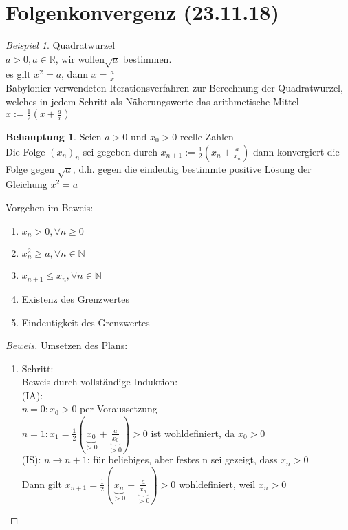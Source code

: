 \documentclass[12pt,a4paper,titlepage]{article} %
\theoremstyle{definition}
\newtheorem*{beh}{Behauptung}
\theoremstyle{remark}
\newtheorem*{bsp}{Beispiel}
\newenvironment{bew}{\begin{proof}[Beweis]}{\end{proof}}
\newcommand{\N}{\mathbb{N}}
\newcommand{\R}{\mathbb{R}}
\begin{document}
	\section{Folgenkonvergenz (23.11.18)}
	\begin{bsp}
		Quadratwurzel\\
		\(a > 0, a \in \R\), wir wollen\(\sqrt{a}\) bestimmen.\\
		es gilt \(x^2 = a\), dann \(x = \frac{a}{x}\)\vspace{5mm}\\
		Babylonier verwendeten Iterationsverfahren zur Berechnung der Quadratwurzel, welches in jedem Schritt als Näherungswerte das arithmetische Mittel\vspace{5mm}\\
		\(x := \frac{1}{2}(x+\frac{a}{x})\)
		\begin{beh}
			Seien \(a > 0\) und \(x_0 > 0\) reelle Zahlen\\
			Die Folge \((x_n)_n\) sei gegeben durch \(x_{n+1} := \frac{1}{2}(x_n + \frac{a}{x_n})\) dann konvergiert die Folge gegen \(\sqrt{a}\), d.h. gegen die eindeutig bestimmte positive Lösung der Gleichung \(x^2 = a\)
		\end{beh}		
		Vorgehen im Beweis:
		\begin{enumerate}
			\item \(x_n > 0, \forall n \geq 0\)
			\item \(x_n^2 \geq a, \forall n \in \N\)
			\item \(x_{n+1} \leq x_n, \forall n \in \N\)
			\item Existenz des Grenzwertes
			\item Eindeutigkeit des Grenzwertes
		\end{enumerate}
		\begin{bew}
			Umsetzen des Plans:\\
			\begin{enumerate}				
				\item Schritt:\\
					Beweis durch vollständige Induktion:\\
					(IA):\\
					\(n=0: x_0 > 0\) per Voraussetzung\\
					\(n=1: x_1 = \frac{1}{2}(\underbrace{x_0}_{>0} + \underbrace{\frac{a}{x_0}}_{>0}) > 0\) ist wohldefiniert, da \(x_0 > 0\)\\
					(IS): \(n \rightarrow n+1\): für beliebiges, aber festes n sei gezeigt, dass \(x_n > 0\)\\
					Dann gilt \(x_{n+1} = \frac{1}{2}(\underbrace{x_n}_{>0} + \underbrace{\frac{a}{x_n}}_{>0}) > 0\) wohldefiniert, weil \(x_n > 0\)\\

\end{enumerate}
\end{bew}
\end{bsp}
\end{document}
